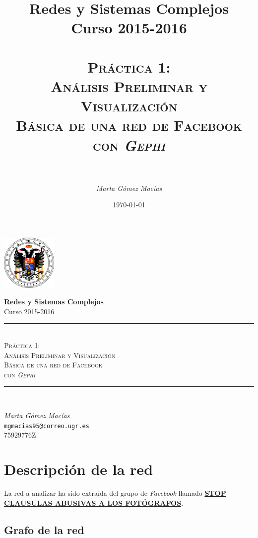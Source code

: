 \documentclass[10pt,a4paper,spanish]{article}
\title{
\normalfont \normalsize 
{\bf Redes y Sistemas Complejos} \\ Curso 2015-2016 \\ [25pt] %
\horrule{0.5pt} \\[0.4cm] %
\huge \textsc{Práctica 1: \\ Análisis Preliminar y Visualización \\ Básica de una red de Facebook \\ con \textit{Gephi}} \\ %
\horrule{2pt} \\[0.5cm] %
}
\author{\textit{Marta Gómez Macías}} %
\numberwithin{equation}{section} %
\numberwithin{figure}{section} %
\numberwithin{table}{section} %
\newcommand{\horrule}[1]{\rule{\linewidth}{#1}} %
\begin{document}
\renewcommand{\listtablename}{Índice de tablas}
\renewcommand{\tablename}{Tabla} 

\begin{titlepage}
\begin{center}
\includegraphics[width=0.2\textwidth]{ugr}

\normalfont \normalsize 
{\bf Redes y Sistemas Complejos} \\ Curso 2015-2016 \\ [25pt] %
\horrule{0.5pt} \\[0.4cm] %
{\huge \textsc{Práctica 1: \\ Análisis Preliminar y Visualización \\ Básica de una red de Facebook \\ con \textit{Gephi} \\}} %
\horrule{2pt} \\[0.5cm] %

{\Large \textit{Marta Gómez Macías} \\ \texttt{mgmacias95@correo.ugr.es} \\ 75929776Z \\[0.5cm]

\date{\today}} %
\end{center}
\end{titlepage}

\tableofcontents %



\section{Descripción de la red}

La red a analizar ha sido extraída del grupo de \textit{Facebook} llamado \href{https://www.facebook.com/groups/bastadeabusosconnuestrasfotos/}{\textbf{STOP CLAUSULAS ABUSIVAS A LOS FOTÓGRAFOS}}.

\subsection{Grafo de la red}
\end{document}
